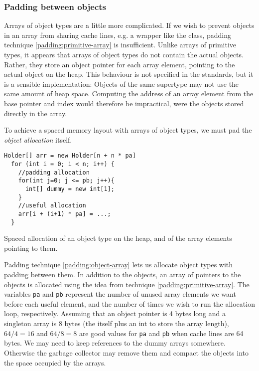 \subsubsection{Padding between objects}
Arrays of object types are a little more complicated.
If we wish to prevent objects in an array from sharing cache lines, e.g.
a wrapper like the  class, padding technique
\ref{padding:primitive-array} is insufficient. Unlike arrays of primitive
types, it appears that arrays of object types do not contain the actual objects.
Rather, they store an object pointer for each array element, pointing to the
actual object on the heap. This behaviour is not specified in the standards, but
it is a sensible implementation: Objects of the same supertype may not use the
same amount of heap space. Computing the address of an array element from the
base pointer and index would therefore be impractical, were the objects
stored directly in the array.

To achieve a spaced memory layout with arrays of object types, we must pad the
\textit{object allocation} itself.

\begin{padding}[h]
\begin{Verbatim}[frame=single]
  Holder[] arr = new Holder[n + n * pa]
  for (int i = 0; i < n; i++) {
    //padding allocation
    for(int j=0; j <= pb; j++){
      int[] dummy = new int[1];
    }
    //useful allocation
    arr[i + (i+1) * pa] = ...;
  }
\end{Verbatim}
	\caption{Spaced allocation of an object type on the heap, and of the
	array elements pointing to them.}
	\label{padding:object-array}
\end{padding}

Padding technique \ref{padding:object-array} lets us allocate object
types with padding between them. In addition to the objects, an array of
pointers to the objects is allocated using the idea from technique
\ref{padding:primitive-array}. The variables \texttt{pa} and \texttt{pb}
represent the number of unused array elements we want before each useful
element, and the number of times we wish to run the allocation loop,
respectively. Assuming that an object pointer is 4 bytes long and a singleton
 array is 8 bytes (the  itself plus an int  to
store the array length), $64/4 = 16$ and $64/8 = 8$ are good values for
\texttt{pa} and \texttt{pb} when cache lines are 64 bytes. We may need to keep
references to the dummy arrays somewhere. Otherwise the garbage collector may
remove them and compact the objects into the space occupied by the arrays.

